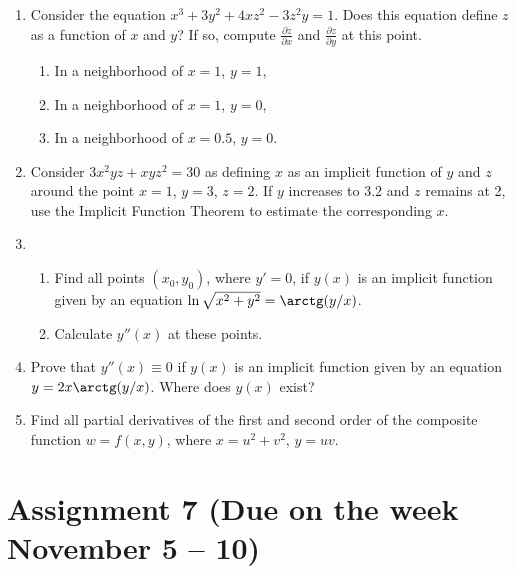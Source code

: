 \documentclass[12pt]{article} %
\theoremstyle{definition} %
\begin{document}
\begin{enumerate}
\item  Consider the equation $x^3+3y^2+4xz^2-3z^2y=1$. 
Does this equation define $z$ as a function of $x$ and $y$? If so, 
compute $\frac{\partial z}{\partial x}$ and $\frac{\partial z}{\partial y}$ at this point.
\begin{enumerate}
\item In a neighborhood of $x=1$, $y=1$,
\item In a neighborhood of $x=1$, $y=0$,
\item In a neighborhood of $x=0.5$, $y=0$.
\end{enumerate}
\item Consider $3x^2yz+xyz^2=30$ as defining $x$ as an implicit function of $y$ and $z$ around the point $x=1$, $y=3$, $z=2$.
If $y$ increases to $3.2$ and $z$ remains at 2, 
use the Implicit Function Theorem to estimate the corresponding $x$.
\item
\begin{enumerate}
\item Find all points $(x_0, y_0)$, where $y'=0$, 
if $y(x)$ is an implicit function given by an equation $\ln\sqrt{x^2+y^2}=\arctg(y/x)$.
\item Calculate $y''(x)$ at these points.
\end{enumerate}
\item Prove that $y''(x)\equiv 0$ if $y(x)$ is an implicit function 
given by an equation $y=2x\arctg(y/x)$. Where does $y(x)$ exist?
\item Find all partial derivatives of the first and second order of the composite function $w=f(x,y)$, 
where $x=u^2+v^2$, $y=uv$.
\end{enumerate}





\section*{Assignment 7 (Due on the week November 5 – 10)}
\end{document}
